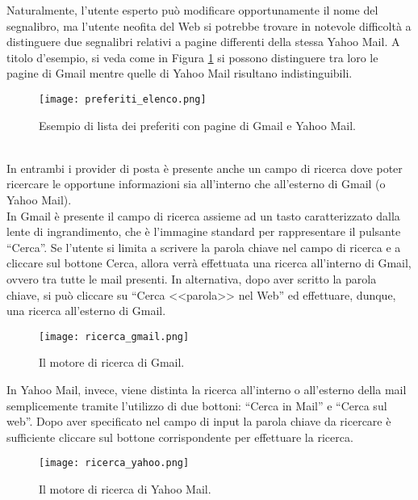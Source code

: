 		Naturalmente, l'utente esperto può modificare opportunamente il nome del segnalibro, ma l'utente neofita del Web si potrebbe trovare in notevole difficoltà a distinguere due segnalibri relativi a pagine differenti della stessa Yahoo Mail. A titolo d'esempio, si veda come in Figura \ref{fig:preferiti_elenco} si possono distinguere tra loro le pagine di Gmail mentre quelle di Yahoo Mail risultano indistinguibili.
		\begin{figure}[h!]
			\begin{center}
				\texttt{[image: preferiti\_elenco.png]}
			\end{center}
			\caption[Lista dei preferiti]{Esempio di lista dei preferiti con pagine di Gmail e Yahoo Mail.}
			\label{fig:preferiti_elenco}
		\end{figure}
		\\
		
		In entrambi i provider di posta è presente anche un campo di ricerca dove poter ricercare le opportune informazioni sia all'interno che all'esterno di Gmail (o Yahoo Mail).\\
		In Gmail è presente il campo di ricerca assieme ad un tasto caratterizzato dalla lente di ingrandimento, che è l'immagine standard per rappresentare il pulsante ``Cerca''. Se l'utente si limita a scrivere la parola chiave nel campo di ricerca e a cliccare sul bottone Cerca, allora verrà effettuata una ricerca all'interno di Gmail, ovvero tra tutte le mail presenti. In alternativa, dopo aver scritto la parola chiave, si può cliccare su ``Cerca <<parola>> nel Web'' ed effettuare, dunque, una ricerca all'esterno di Gmail.
		\begin{figure}[h!]
			\begin{center}
				\texttt{[image: ricerca\_gmail.png]}
			\end{center}
			\caption[Ricerca in Gmail]{Il motore di ricerca di Gmail.}
			\label{fig:ricerca_gmail}
		\end{figure}
		
		In Yahoo Mail, invece, viene distinta la ricerca all'interno o all'esterno della mail semplicemente tramite l'utilizzo di due bottoni: ``Cerca in Mail'' e ``Cerca sul web''. Dopo aver specificato nel campo di input la parola chiave da ricercare è sufficiente cliccare sul bottone corrispondente per effettuare la ricerca.
		\begin{figure}[h!]
			\begin{center}
				\texttt{[image: ricerca\_yahoo.png]}
			\end{center}
			\caption[Ricerca in Yahoo Mail]{Il motore di ricerca di Yahoo Mail.}
			\label{fig:ricerca_yahoo}
		\end{figure}
		\\
		
